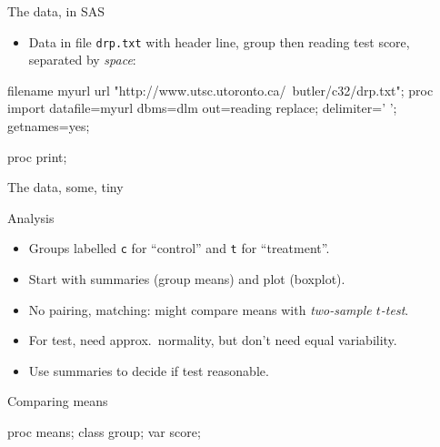 \documentclass[unknownkeysallowed]{beamer}\usepackage[]{graphicx}\usepackage[]{color}
\begin{document}
\begin{frame}[fragile]{The data, in SAS}

  \begin{itemize}
    \item Data in file \texttt{drp.txt} with header line, group then
    reading test score, separated by \emph{space}:
  \end{itemize}

\begin{Datastep}
filename myurl url 
  "http://www.utsc.utoronto.ca/~butler/c32/drp.txt";  
proc import
  datafile=myurl
  dbms=dlm
  out=reading
  replace;
  delimiter=' ';
  getnames=yes;
\end{Datastep}
\begin{Sascode}[store=ix]
  proc print;
\end{Sascode}
  
\end{frame}


\begin{frame}[fragile]{The data, some, tiny}

  
\end{frame}


\begin{frame}[fragile]{Analysis}

  \begin{itemize}
    \item Groups labelled \texttt{c} for ``control'' and \texttt{t}
      for ``treatment''.
    \item Start with summaries (group means) and plot (boxplot).
  \item No pairing, matching: might compare means with \emph{two-sample $t$-test}.
  \item For test, need approx.\ normality, but don't need equal variability.
    \item Use summaries to decide if test reasonable.

  \end{itemize}
  
\end{frame}

\begin{frame}[fragile]{Comparing means}

\begin{Sascode}[store=if]
  proc means;
    class group;
    var score;
\end{Sascode}

  
\end{frame}
\end{document}
